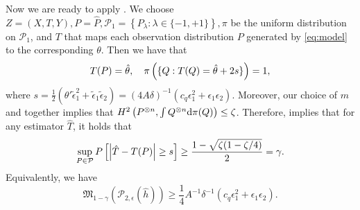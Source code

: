 \documentclass{article}
\def\eps{{\epsilon}}
\def\gP{{\mathcal{P}}}
\newcommand{\dd}{\textup{d}}
\begin{document}
Now we are ready to apply . We choose $Z=(X,T,Y), P=\hat{P}, \gP_1=\left\{P_{\lambda}:\lambda\in\{-1,+1\}\right\}, \pi$ be the uniform distribution on $\gP_1$, and $T$ that maps each observation distribution $P$ generated by \eqref{eq:model} to the corresponding $\theta$. Then we have that
\begin{equation}
    \notag
    T(P) = \hat{\theta},\quad \pi\left(\{Q: T(Q) = \hat{\theta} + 2s\}\right) = 1,
\end{equation}
where $s=\frac{1}{2}(\theta'\tilde{\eps}_1^2+\tilde{\eps}_1\tilde{\eps}_2)=(4A\delta)^{-1}(c_q\eps_1^2+\eps_1\eps_2)$.
Moreover, our choice of $m$ and   together implies that $H^2\left(P^{\otimes n}, \int Q^{\otimes n}\dd\pi(Q)\right)\leq\zeta$. Therefore,   implies that for any estimator $\hat{T}$, it holds that
\begin{equation}
    \notag
    \sup_{P\in\gP} P\left[ \left|\hat{T}-T(P)\right|\geq s \right] \geq \frac{1-\sqrt{\zeta(1-\zeta / 4)}}{2} = \gamma.
\end{equation}
Equivalently, we have 
\begin{equation}
    \label{eq:binary-lower-bound-first-part}
    \mathfrak{M}_{1-\gamma}\left(\gP_{2,\eps}(\hat{h})\right) \geq \frac{1}{4} A^{-1} \delta^{-1}(c_q\eps_1^2+\eps_1\eps_2).
\end{equation}
\end{document}
